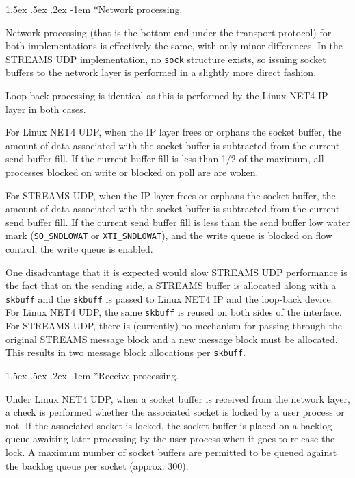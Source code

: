 \documentclass[letterpaper,final,notitlepage,twocolumn,10pt,twoside]{article}
\makeatletter
\renewcommand\paragraph{\@startsection{paragraph}{4}{\z@}%
                                    {1.5ex \@plus .5ex \@minus .2ex}%
                                    {-1em}%
                                    {\normalfont\normalsize\bfseries\slshape}}
\makeatother
\begin{document}
\paragraph*{Network processing.}

Network processing (that is the bottom end under the transport protocol) for
both implementations is effectively the same, with only minor differences.  In
the STREAMS UDP implementation, no \texttt{sock} structure exists, so issuing
socket buffers to the network layer is performed in a slightly more direct
fashion.

Loop-back processing is identical as this is performed by the Linux NET4 IP
layer in both cases.

For Linux NET4 UDP, when the IP layer frees or orphans the socket buffer, the
amount of data associated with the socket buffer is subtracted from the
current send buffer fill.  If the current buffer fill is less than 1/2 of the
maximum, all processes blocked on write or blocked on poll are are woken.

For STREAMS UDP, when the IP layer frees or orphans the socket buffer, the
amount of data associated with the socket buffer is subtracted from the
current send buffer fill.  If the current send buffer fill is less than the
send buffer low water mark (\texttt{SO\_SNDLOWAT} or \texttt{XTI\_SNDLOWAT}),
and the write queue is blocked on flow control, the write queue is enabled.

One disadvantage that it is expected would slow STREAMS UDP performance is the
fact that on the sending side, a STREAMS buffer is allocated along with a
\texttt{skbuff} and the \texttt{skbuff} is passed to Linux NET4 IP and the
loop-back device.  For Linux NET4 UDP, the same \texttt{skbuff} is reused on
both sides of the interface.  For STREAMS UDP, there is (currently) no
mechanism for passing through the original STREAMS message block and a new
message block must be allocated.  This results in two message block
allocations per \texttt{skbuff}.

\paragraph*{Receive processing.}

Under Linux NET4 UDP, when a socket buffer is received from the network layer,
a check is performed whether the associated socket is locked by a user process
or not.  If the associated socket is locked, the socket buffer is placed on a
backlog queue awaiting later processing by the user process when it goes to
release the lock.  A maximum number of socket buffers are permitted to be
queued against the backlog queue per socket (approx. 300).
\end{document}
